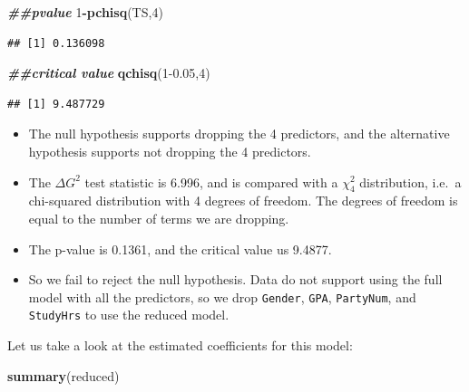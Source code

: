 \documentclass[
]{book}
\newenvironment{Shaded}{\begin{snugshade}}{\end{snugshade}}
\newcommand{\DecValTok}[1]{\textcolor[rgb]{0.00,0.00,0.81}{#1}}
\newcommand{\DocumentationTok}[1]{\textcolor[rgb]{0.56,0.35,0.01}{\textbf{\textit{#1}}}}
\newcommand{\FloatTok}[1]{\textcolor[rgb]{0.00,0.00,0.81}{#1}}
\newcommand{\FunctionTok}[1]{\textcolor[rgb]{0.13,0.29,0.53}{\textbf{#1}}}
\newcommand{\NormalTok}[1]{#1}
\newcommand{\SpecialCharTok}[1]{\textcolor[rgb]{0.81,0.36,0.00}{\textbf{#1}}}
\providecommand{\tightlist}{%
  \setlength{\itemsep}{0pt}\setlength{\parskip}{0pt}}
\begin{document}
\begin{Shaded}
\begin{Highlighting}[]
\DocumentationTok{\#\#pvalue}
\DecValTok{1}\SpecialCharTok{{-}}\FunctionTok{pchisq}\NormalTok{(TS,}\DecValTok{4}\NormalTok{)}
\end{Highlighting}
\end{Shaded}

\begin{verbatim}
## [1] 0.136098
\end{verbatim}

\begin{Shaded}
\begin{Highlighting}[]
\DocumentationTok{\#\#critical value}
\FunctionTok{qchisq}\NormalTok{(}\DecValTok{1}\FloatTok{{-}0.05}\NormalTok{,}\DecValTok{4}\NormalTok{)}
\end{Highlighting}
\end{Shaded}

\begin{verbatim}
## [1] 9.487729
\end{verbatim}

\begin{itemize}
\tightlist
\item
  The null hypothesis supports dropping the 4 predictors, and the alternative hypothesis supports not dropping the 4 predictors.
\item
  The \(\Delta G^2\) test statistic is 6.996, and is compared with a \(\chi^2_4\) distribution, i.e.~a chi-squared distribution with 4 degrees of freedom. The degrees of freedom is equal to the number of terms we are dropping.
\item
  The p-value is 0.1361, and the critical value us 9.4877.
\item
  So we fail to reject the null hypothesis. Data do not support using the full model with all the predictors, so we drop \texttt{Gender}, \texttt{GPA}, \texttt{PartyNum}, and \texttt{StudyHrs} to use the reduced model.
\end{itemize}

Let us take a look at the estimated coefficients for this model:

\begin{Shaded}
\begin{Highlighting}[]
\FunctionTok{summary}\NormalTok{(reduced)}
\end{Highlighting}
\end{Shaded}
\end{document}
